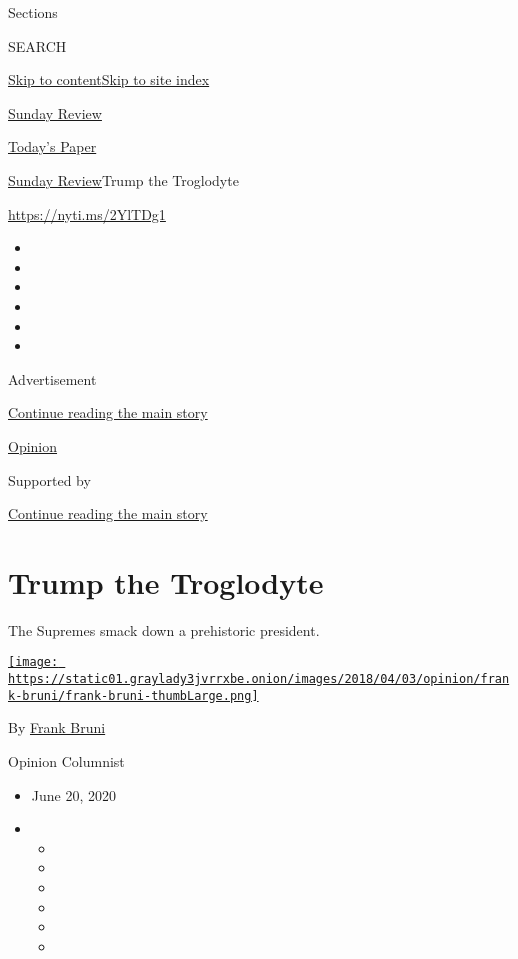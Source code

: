 Sections

SEARCH

\protect\hyperlink{site-content}{Skip to
content}\protect\hyperlink{site-index}{Skip to site index}

\href{https://www.nytimes3xbfgragh.onion/section/opinion/sunday}{Sunday
Review}

\href{https://myaccount.nytimes3xbfgragh.onion/auth/login?response_type=cookie\&client_id=vi}{}

\href{https://www.nytimes3xbfgragh.onion/section/todayspaper}{Today's
Paper}

\href{/section/opinion/sunday}{Sunday Review}\textbar{}Trump the
Troglodyte

\href{https://nyti.ms/2YlTDg1}{https://nyti.ms/2YlTDg1}

\begin{itemize}
\item
\item
\item
\item
\item
\item
\end{itemize}

Advertisement

\protect\hyperlink{after-top}{Continue reading the main story}

\href{/section/opinion}{Opinion}

Supported by

\protect\hyperlink{after-sponsor}{Continue reading the main story}

\hypertarget{trump-the-troglodyte}{%
\section{Trump the Troglodyte}\label{trump-the-troglodyte}}

The Supremes smack down a prehistoric president.

\href{https://www.nytimes3xbfgragh.onion/by/frank-bruni}{\texttt{[image: https://static01.graylady3jvrrxbe.onion/images/2018/04/03/opinion/frank-bruni/frank-bruni-thumbLarge.png]}}

By \href{https://www.nytimes3xbfgragh.onion/by/frank-bruni}{Frank Bruni}

Opinion Columnist

\begin{itemize}
\item
  June 20, 2020
\item
  \begin{itemize}
  \item
  \item
  \item
  \item
  \item
  \item
  \end{itemize}
\end{itemize}

